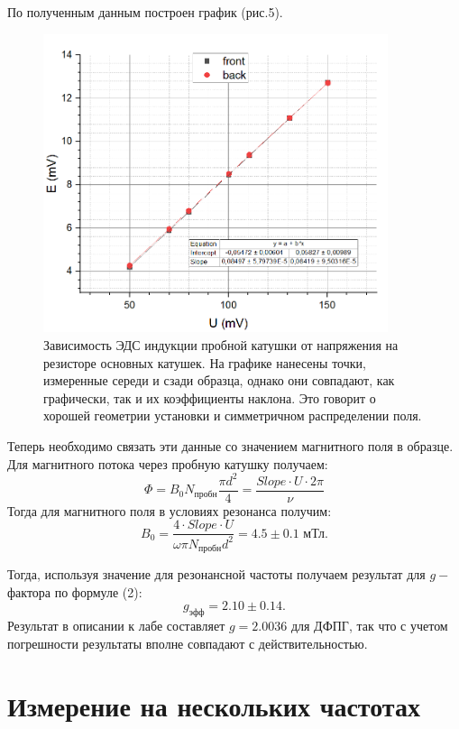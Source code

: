 \documentclass[a4paper, 14pt]{extarticle}%
\newcommand\ECaption[1]{%
     \captionsetup{font=footnotesize}%
     \caption{#1}}
\begin{document}
По полученным данным построен график (рис.5).
\begin{figure}[h]
\begin{center}
\includegraphics[width=0.9\textwidth]{gr1}
\ECaption{Зависимость ЭДС индукции пробной катушки от напряжения на резисторе основных катушек. На графике нанесены точки, измеренные середи и сзади образца, однако они совпадают, как графически, так и их коэффициенты наклона. Это говорит о хорошей геометрии установки и симметричном распределении поля.}
\end{center}
\end{figure}

Теперь необходимо связать эти данные со значением магнитного поля в образце. Для магнитного потока через пробную катушку получаем:
\begin{equation}
\Phi = B_0 N_{\text{пробн}} \frac{\pi d^2}{4} = \frac{Slope\cdot U \cdot 2\pi}{\nu}
\end{equation}
Тогда для магнитного поля в условиях резонанса получим:
\begin{equation}
B_0 = \frac{4\cdot Slope\cdot U}{\omega \pi N_{\text{пробн}} d^2} = 4.5\pm0.1\text{ мТл}.
\end{equation}

Тогда, используя значение для резонансной частоты получаем результат для $g-$фактора по формуле (2):
\[g_{\text{эфф}} = 2.10\pm 0.14.\]
Результат в описании к лабе составляет $g = 2.0036$ для ДФПГ, так что с учетом погрешности результаты вполне совпадают с действительностью.
\newpage
\section*{Измерение на нескольких частотах}
\end{document}
